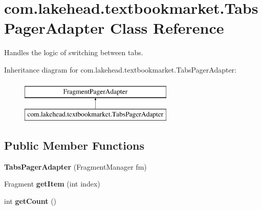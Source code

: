 \hypertarget{classcom_1_1lakehead_1_1textbookmarket_1_1_tabs_pager_adapter}{\section{com.\-lakehead.\-textbookmarket.\-Tabs\-Pager\-Adapter Class Reference}
\label{classcom_1_1lakehead_1_1textbookmarket_1_1_tabs_pager_adapter}
}


Handles the logic of switching between tabs.  


Inheritance diagram for com.\-lakehead.\-textbookmarket.\-Tabs\-Pager\-Adapter\-:\begin{figure}[H]
\begin{center}
\leavevmode
\includegraphics[height=2.000000cm]{classcom_1_1lakehead_1_1textbookmarket_1_1_tabs_pager_adapter}
\end{center}
\end{figure}
\subsection*{Public Member Functions}
\begin{DoxyCompactItemize}
\item 
\hypertarget{classcom_1_1lakehead_1_1textbookmarket_1_1_tabs_pager_adapter_a476af2528b8871709e1580b231c8e942}{{\bfseries Tabs\-Pager\-Adapter} (Fragment\-Manager fm)}\label{classcom_1_1lakehead_1_1textbookmarket_1_1_tabs_pager_adapter_a476af2528b8871709e1580b231c8e942}

\item 
\hypertarget{classcom_1_1lakehead_1_1textbookmarket_1_1_tabs_pager_adapter_a224189d6c739fdffd5653d3d7149cca7}{Fragment {\bfseries get\-Item} (int index)}\label{classcom_1_1lakehead_1_1textbookmarket_1_1_tabs_pager_adapter_a224189d6c739fdffd5653d3d7149cca7}

\item 
\hypertarget{classcom_1_1lakehead_1_1textbookmarket_1_1_tabs_pager_adapter_a34e5de6c38099e04a83ceea6cb9bed18}{int {\bfseries get\-Count} ()}\label{classcom_1_1lakehead_1_1textbookmarket_1_1_tabs_pager_adapter_a34e5de6c38099e04a83ceea6cb9bed18}

\end{DoxyCompactItemize}


